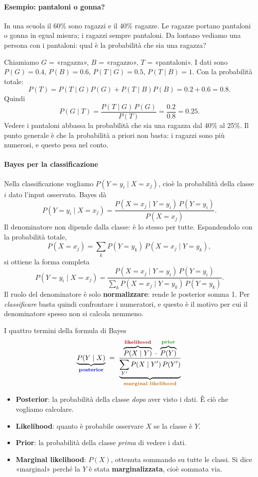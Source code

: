 \documentclass[12pt]{extarticle}
\begin{document}
\paragraph{Esempio: pantaloni o gonna?}
In una scuola il 60\% sono ragazzi e il 40\% ragazze. Le ragazze portano pantaloni o gonna in egual misura; i ragazzi sempre pantaloni. Da lontano vediamo una persona con i pantaloni: qual è la probabilità che sia una ragazza?

\noindent Chiamiamo $G$ = «ragazza», $B$ = «ragazzo», $T$ = «pantaloni». I dati sono $P(G)=0.4$, $P(B)=0.6$, $P(T \mid G)=0.5$, $P(T \mid B)=1$. Con la probabilità totale:
\[
P(T) = P(T \mid G)P(G) + P(T \mid B)P(B) = 0.2 + 0.6 = 0.8.
\]
Quindi
\[
P(G \mid T) = \frac{P(T \mid G)\,P(G)}{P(T)} = \frac{0.2}{0.8} = 0.25.
\]
Vedere i pantaloni abbassa la probabilità che sia una ragazza dal 40\% al 25\%. Il punto generale è che la probabilità a priori non basta: i ragazzi sono più numerosi, e questo pesa nel conto.

\paragraph{Bayes per la classificazione}
Nella classificazione vogliamo $P(Y=y_i \mid X=x_j)$, cioè la probabilità della classe $i$ dato l'input osservato. Bayes dà
\[
P(Y=y_i \mid X=x_j) = \frac{P(X=x_j \mid Y=y_i)\,P(Y=y_i)}{P(X=x_j)}.
\]
Il denominatore non dipende dalla classe: è lo stesso per tutte. Espandendolo con la probabilità totale,
\[
P(X=x_j) = \sum_{k} P(Y=y_k)\,P(X=x_j \mid Y=y_k),
\]
si ottiene la forma completa
\[
P(Y=y_i \mid X=x_j) = \frac{P(X=x_j \mid Y=y_i)\,P(Y=y_i)}{\sum_k P(X=x_j \mid Y=y_k)\,P(Y=y_k)}.
\]
Il ruolo del denominatore è solo \textbf{normalizzare}: rende le posterior somma 1. Per \emph{classificare} basta quindi confrontare i numeratori, e questo è il motivo per cui il denominatore spesso non si calcola nemmeno.

\begin{ideabox}{I quattro termini della formula di Bayes}
\[
\underbrace{P(Y \mid X)}_{\textbf{\color{blue!80!black}posterior}}
\;=\; \frac{\overbrace{P(X \mid Y)}^{\textbf{\color{red!70!black}likelihood}} \;\cdot\; \overbrace{P(Y)}^{\textbf{\color{green!60!black}prior}}}{\underbrace{\sum_{Y'} P(X \mid Y')\, P(Y')}_{\textbf{\color{orange!80!black}marginal likelihood}}}
\]
\begin{itemize}
    \item \textbf{Posterior}: la probabilità della classe \emph{dopo} aver visto i dati. È ciò che vogliamo calcolare.
    \item \textbf{Likelihood}: quanto è probabile osservare $X$ se la classe è $Y$.
    \item \textbf{Prior}: la probabilità della classe \emph{prima} di vedere i dati.
    \item \textbf{Marginal likelihood}: $P(X)$, ottenuta sommando su tutte le classi. Si dice «marginal» perché la $Y$ è stata \textbf{marginalizzata}, cioè sommata via.
\end{itemize}
\end{ideabox}
\end{document}
